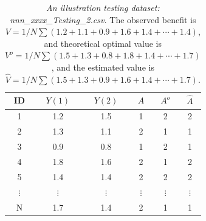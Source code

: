 \documentclass[12pt]{article}
\def\hat{\widehat}
\begin{document}
\begin{table}[htbp]
	\centering
	\caption{\emph{An illustration testing dataset: nnn\_xxxx\_Testing\_2.csv.} The observed benefit is $V=1/N \sum (1.2+1.1+0.9+1.6+1.4+\cdots+1.4)$, and theoretical optimal value is $V^o=1/N \sum (1.5+1.3+0.8+1.8+1.4+\cdots+1.7)$, and the estimated value is $\hat{V}=1/N \sum (1.5+1.3+0.9+1.6+1.4+\cdots+1.7)$.}
	\begin{tabular}{c|cc|ccc}
		\hline
		ID &  $Y(1)$    & $Y(2)$    & $A$ & $A^o$ & $\hat{A} $  \\
		\hline
		1& 1.2    & 1.5    &   1& 2 &2 \\
		2& 1.3    & 1.1    &  2 & 1 &1\\
		3& 0.9    & 0.8    &    1 & 2 &1 \\
		4& 1.8    & 1.6    &   2 & 1 &2 \\
		5& 1.4    & 1.4    &  2 & 2 &2 \\
		$\vdots$ &  $\vdots$   & $\vdots$     & $\vdots$     & $\vdots$ &  $\vdots$    \\
		N & 1.7    & 1.4    &   2 & 1 &1\\
		\hline
		\hline
	\end{tabular}%
	\label{tab:TestingDataExample3}%
\end{table}
\end{document}
